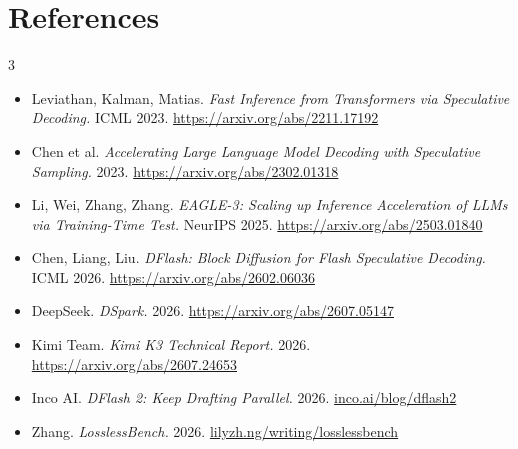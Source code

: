\documentclass{article}
\begin{document}
\vspace{-8pt}\section*{References}
{\footnotesize
\begin{multicols}{3}
\begin{itemize}
  \item Leviathan, Kalman, Matias. \emph{Fast Inference from Transformers via Speculative Decoding.} ICML 2023. \url{https://arxiv.org/abs/2211.17192}
  \item Chen et al. \emph{Accelerating Large Language Model Decoding with Speculative Sampling.} 2023. \url{https://arxiv.org/abs/2302.01318}
  \item Li, Wei, Zhang, Zhang. \emph{EAGLE-3: Scaling up Inference Acceleration of LLMs via Training-Time Test.} NeurIPS 2025. \url{https://arxiv.org/abs/2503.01840}
  \item Chen, Liang, Liu. \emph{DFlash: Block Diffusion for Flash Speculative Decoding.} ICML 2026. \url{https://arxiv.org/abs/2602.06036}
  \item DeepSeek. \emph{DSpark.} 2026. \url{https://arxiv.org/abs/2607.05147}
  \item Kimi Team. \emph{Kimi K3 Technical Report.} 2026. \url{https://arxiv.org/abs/2607.24653}
  \item Inco AI. \emph{DFlash 2: Keep Drafting Parallel.} 2026. \href{https://inco.ai/blog/dflash2/}{inco.ai/blog/dflash2}
  \item Zhang. \emph{LosslessBench.} 2026. \href{https://lilyzh.ng/writing/losslessbench/}{lilyzh.ng/writing/losslessbench}
\end{itemize}
\end{multicols}
}
\end{document}
